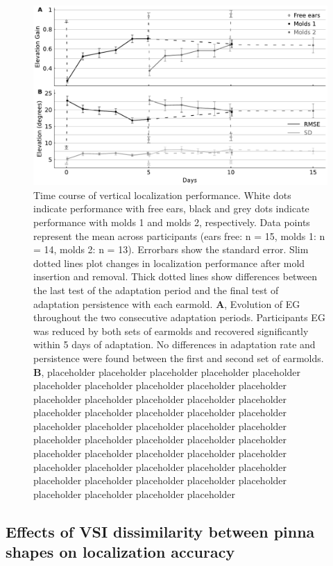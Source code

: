  \begin{figure}[ht]
	\includegraphics[width=18cm, center]{../Results/figures/fig5/fig5}
	\caption{Time course of vertical localization performance. White dots indicate performance with free ears, black and grey dots indicate performance with molds 1 and molds 2, respectively. Data points represent the mean across participants (ears free: n = 15, molds 1: n = 14, molds 2: n = 13). Errorbars show the standard error. Slim dotted lines plot changes in localization performance after mold insertion and removal. Thick dotted lines show differences between the last test of the adaptation period and the final test of adaptation persistence with each earmold. \textbf{A}, Evolution of EG throughout the two consecutive adaptation periods. Participants EG was reduced by both sets of earmolds and recovered significantly within 5 days of adaptation. No differences in adaptation rate and persistence were found between the first and second set of earmolds. \textbf{B}, placeholder placeholder placeholder placeholder placeholder placeholder placeholder placeholder placeholder placeholder placeholder placeholder placeholder placeholder placeholder placeholder placeholder placeholder placeholder placeholder placeholder placeholder placeholder placeholder placeholder placeholder placeholder placeholder placeholder placeholder placeholder placeholder placeholder placeholder placeholder placeholder placeholder placeholder placeholder placeholder placeholder placeholder placeholder placeholder placeholder placeholder placeholder placeholder placeholder }
        \label{fig:adaptation}
\end{figure}

\subsection{Effects of VSI dissimilarity between pinna shapes on localization accuracy}

